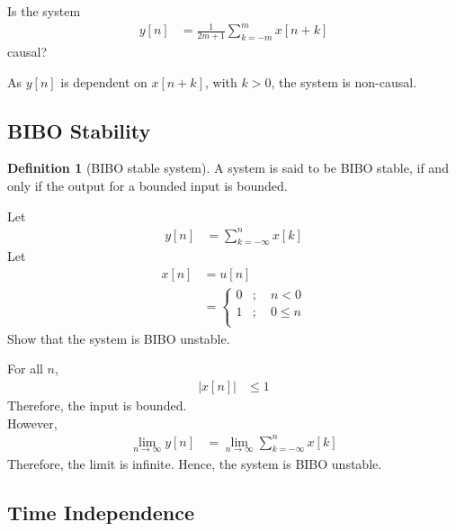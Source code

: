 \documentclass[titlepage, fleqn, a4paper, 12pt, twoside]{article}
\theoremstyle{definition}
\newtheorem{definition}{Definition}
\theoremstyle{theorem}
\begin{document}
\begin{question}
	Is the system
	\begin{align*}
		y[n] & = \frac{1}{2 m + 1} \sum\limits_{k = -m}^{m} x[n + k]
	\end{align*}
	causal?
\end{question}

\begin{solution}
	As $y[n]$ is dependent on $x[n + k]$, with $k > 0$, the system is non-causal.
\end{solution}

\subsection{BIBO Stability}

\begin{definition}[BIBO stable system]
	A system is said to be BIBO stable, if and only if the output for a bounded input is bounded.
\end{definition}

\begin{question}
	Let
	\begin{align*}
		y[n] & = \sum\limits_{k = -\infty}^{n} x[k]
	\end{align*}
	Let
	\begin{align*}
		x[n] &= u[n]\\
		&=
			\begin{cases}
				0 & ;\quad n < 0   \\
				1 & ;\quad 0 \le n \\
			\end{cases}
	\end{align*}
	Show that the system is BIBO unstable.
\end{question}

\begin{solution}
	For all $n$,
	\begin{align*}
		\left| x[n] \right| & \le 1
	\end{align*}
	Therefore, the input is bounded.\\
	However,
	\begin{align*}
		\lim\limits_{n \to \infty} y[n] & = \lim\limits_{n \to \infty} \sum\limits_{k = -\infty}^{n} x[k]
	\end{align*}
	Therefore, the limit is infinite.
	Hence, the system is BIBO unstable.
\end{solution}

\subsection{Time Independence}
\end{document}
